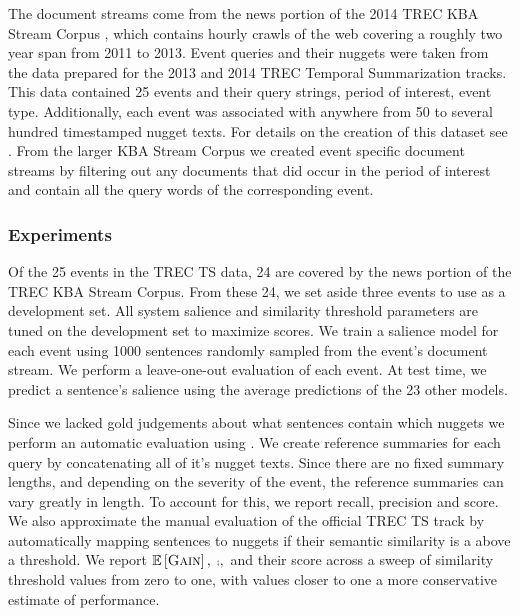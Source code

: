     
  The document streams come from the news portion of the 2014 TREC
KBA Stream Corpus \citep{frank2012building}, which contains hourly crawls
of the web covering a roughly two year span from 2011 to 2013.
Event queries and their nuggets were taken from the data prepared for 
the 2013 and 2014 TREC Temporal Summarization tracks. This data
contained 25 events and their query strings, period of interest, 
event type. 
Additionally, each event was associated with anywhere from 50 to several
hundred timestamped nugget texts. 
For details on the creation of this dataset see \cite{aslam2014trec,aslam2015trec}.
From the larger KBA Stream Corpus we created event specific document 
streams by filtering out any documents that did occur in the period
of interest and contain all the query words of the corresponding event.  



    \subsubsection{Experiments}

    

Of the 25 events in the TREC TS data, 24 are
covered by the news portion of the TREC KBA
Stream Corpus. From these 24, we set aside
three events to use as a development set. All
system salience and similarity threshold parameters
are tuned on the development set to maximize
 \fmeasure{} scores.
We train a salience model for each event using
1000 sentences randomly sampled from the
event's document stream.
We perform a leave-one-out evaluation of each
event. At test time, we predict a sentence’s
salience using the average predictions of the 23
other models.



    Since we lacked gold judgements about what sentences contain which nuggets
    we perform an automatic evaluation using \rouge{} \citep{lin2004rouge}. We 
    create reference summaries for each query by concatenating all 
    of it's nugget texts.
    Since there are no fixed summary lengths, and depending on the severity
    of the event, the reference summaries can vary greatly in length.
    To account for this, we report \rouge{} recall, precision and \fmeasure{}
    score.
We also approximate the manual evaluation of the official TREC TS track
    by automatically mapping sentences to nuggets if their semantic similarity
    is a above a threshold. 
    We report $\mathbb{E}\left[\textsc{Gain}\right],$ $\comp,$ and their \fmeasure{} score
    across a sweep of similarity threshold 
    values from zero to one, with values closer to one a more conservative
    estimate of performance.     


